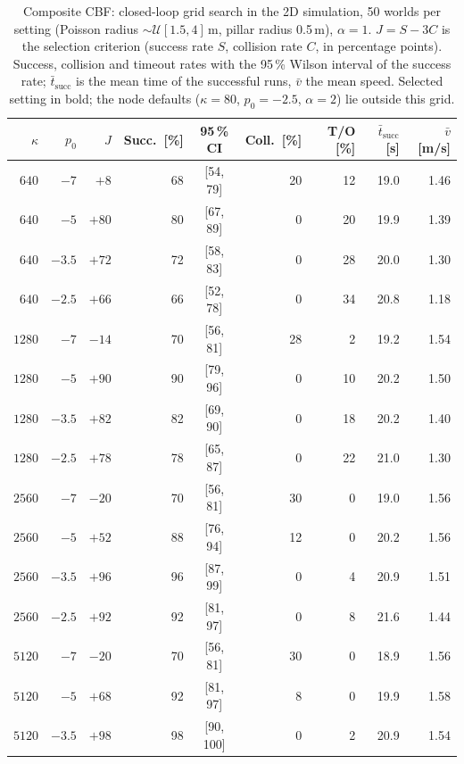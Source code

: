 \begin{table}[t]
\centering
\small
\caption{Composite CBF: closed-loop grid search in the 2D simulation, 50 worlds per setting (Poisson radius $\sim\mathcal{U}[1.5, 4]$\,m, pillar radius 0.5\,m), $\alpha = 1$. $J = S - 3C$ is the selection criterion (success rate $S$, collision rate $C$, in percentage points). Success, collision and timeout rates with the 95\,\% Wilson interval of the success rate; $\bar t_\mathrm{succ}$ is the mean time of the successful runs, $\bar v$ the mean speed. Selected setting in bold; the node defaults ($\kappa = 80$, $p_0 = -2.5$, $\alpha = 2$) lie outside this grid.}
\label{tab:gridsearch_ccbf}
\begin{tabular}{rrrrcrrrr}
\toprule
$\kappa$ & $p_0$ & $J$ & Succ.\ [\%] & 95\,\% CI & Coll.\ [\%] & T/O [\%] & $\bar t_\mathrm{succ}$ [s] & $\bar v$ [m/s] \\
\midrule
$640$ & $-7$ & $+8$ & 68 & [54, 79] & 20 & 12 & 19.0 & 1.46 \\
$640$ & $-5$ & $+80$ & 80 & [67, 89] & 0 & 20 & 19.9 & 1.39 \\
$640$ & $-3.5$ & $+72$ & 72 & [58, 83] & 0 & 28 & 20.0 & 1.30 \\
$640$ & $-2.5$ & $+66$ & 66 & [52, 78] & 0 & 34 & 20.8 & 1.18 \\
\midrule
$1280$ & $-7$ & $-14$ & 70 & [56, 81] & 28 & 2 & 19.2 & 1.54 \\
$1280$ & $-5$ & $+90$ & 90 & [79, 96] & 0 & 10 & 20.2 & 1.50 \\
$1280$ & $-3.5$ & $+82$ & 82 & [69, 90] & 0 & 18 & 20.2 & 1.40 \\
$1280$ & $-2.5$ & $+78$ & 78 & [65, 87] & 0 & 22 & 21.0 & 1.30 \\
\midrule
$2560$ & $-7$ & $-20$ & 70 & [56, 81] & 30 & 0 & 19.0 & 1.56 \\
$2560$ & $-5$ & $+52$ & 88 & [76, 94] & 12 & 0 & 20.2 & 1.56 \\
$2560$ & $-3.5$ & $+96$ & 96 & [87, 99] & 0 & 4 & 20.9 & 1.51 \\
$2560$ & $-2.5$ & $+92$ & 92 & [81, 97] & 0 & 8 & 21.6 & 1.44 \\
\midrule
$5120$ & $-7$ & $-20$ & 70 & [56, 81] & 30 & 0 & 18.9 & 1.56 \\
$5120$ & $-5$ & $+68$ & 92 & [81, 97] & 8 & 0 & 19.9 & 1.58 \\
$5120$ & $-3.5$ & $+98$ & 98 & [90, 100] & 0 & 2 & 20.9 & 1.54 \\

\end{tabular}
\end{table}
